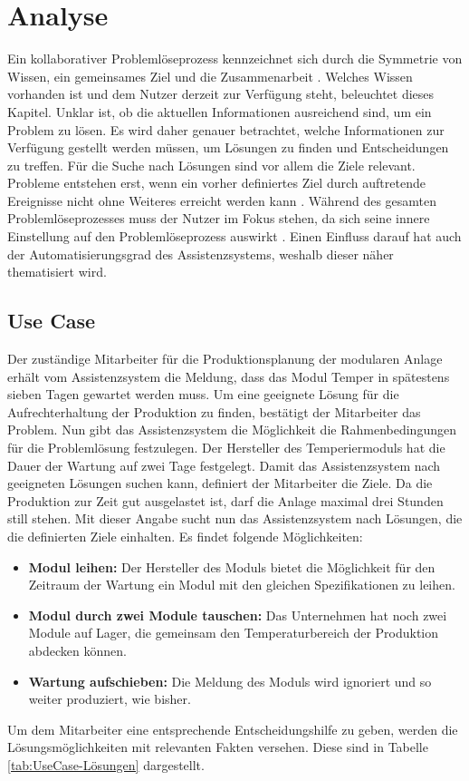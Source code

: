 
\chapter{Analyse}
\label{sec:Anforderungsanalyse}
Ein kollaborativer Problemlöseprozess kennzeichnet sich durch die Symmetrie von Wissen, ein gemeinsames Ziel und die Zusammenarbeit \cite{Rummel1958}. Welches Wissen vorhanden ist und dem Nutzer derzeit zur Verfügung steht, beleuchtet dieses Kapitel. Unklar ist, ob die aktuellen Informationen ausreichend sind, um ein Problem zu lösen. Es wird daher genauer betrachtet, welche Informationen zur Verfügung gestellt werden müssen, um Lösungen zu finden und Entscheidungen zu treffen. Für die Suche nach Lösungen sind vor allem die Ziele relevant. Probleme entstehen erst, wenn ein vorher definiertes Ziel durch auftretende Ereignisse nicht ohne Weiteres erreicht werden kann \cite{Funke2015, Betsch2011}. Während des gesamten Problemlöseprozesses muss der Nutzer im Fokus stehen, da sich seine innere Einstellung auf den Problemlöseprozess auswirkt \cite{Dorner1984}. Einen Einfluss darauf hat auch der Automatisierungsgrad des Assistenzsystems, weshalb dieser näher thematisiert wird.

\section{Use Case}
Der zuständige Mitarbeiter für die Produktionsplanung der modularen Anlage erhält vom Assistenzsystem die Meldung, dass das Modul Temper in spätestens sieben Tagen gewartet werden muss. Um eine geeignete Lösung für die Aufrechterhaltung der Produktion zu finden, bestätigt der Mitarbeiter das Problem. Nun gibt das Assistenzsystem die Möglichkeit die Rahmenbedingungen für die Problemlösung festzulegen. Der Hersteller des Temperiermoduls hat die Dauer der Wartung auf zwei Tage festgelegt. Damit das Assistenzsystem nach geeigneten Lösungen suchen kann, definiert der Mitarbeiter die Ziele. Da die Produktion zur Zeit gut ausgelastet ist, darf die Anlage maximal drei Stunden still stehen. Mit dieser Angabe sucht nun das Assistenzsystem nach Lösungen, die die definierten Ziele einhalten. Es findet folgende Möglichkeiten:
\begin{itemize}
\item \textbf{Modul leihen:} Der Hersteller des Moduls bietet die Möglichkeit für den Zeitraum der Wartung ein Modul mit den gleichen Spezifikationen zu leihen.
\item \textbf{Modul durch zwei Module tauschen:} Das Unternehmen hat noch zwei Module auf Lager, die gemeinsam den Temperaturbereich der Produktion abdecken können.
\item \textbf{Wartung aufschieben:} Die Meldung des Moduls wird ignoriert und so weiter produziert, wie bisher.
\end{itemize}
Um dem Mitarbeiter eine entsprechende Entscheidungshilfe zu geben, werden die Lösungsmöglichkeiten mit relevanten Fakten versehen. Diese sind in Tabelle \ref{tab:UseCase-Lösungen} dargestellt.

